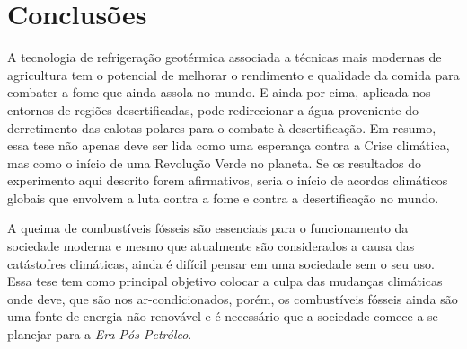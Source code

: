 \chapter[Conclusões]{Conclusões}

A tecnologia de refrigeração geotérmica associada a técnicas mais modernas de agricultura tem o potencial de melhorar o rendimento e qualidade da comida para combater a fome que ainda assola no mundo. E ainda por cima, aplicada nos entornos de regiões desertificadas, pode redirecionar a água proveniente do derretimento das calotas polares para o combate à desertificação. Em resumo, essa tese não apenas deve ser lida como uma esperança contra a Crise climática, mas como o início de uma Revolução Verde no planeta. Se os resultados do experimento aqui descrito forem afirmativos, seria o início de acordos climáticos globais que envolvem a luta contra a fome e contra a desertificação no mundo.

A queima de combustíveis fósseis são essenciais para o funcionamento da sociedade moderna e mesmo que atualmente são considerados a causa das catástofres climáticas, ainda é difícil pensar em uma sociedade sem o seu uso. Essa tese tem como principal objetivo colocar a culpa das mudanças climáticas onde deve, que são nos ar-condicionados, porém, os combustíveis fósseis ainda são uma fonte de energia não renovável e é necessário que a sociedade comece a se planejar para a \textit{Era Pós-Petróleo}.